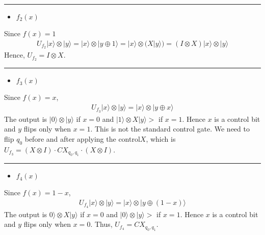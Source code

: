 \documentclass[letterpaper,10pt,english]{jupyterBook}
\begin{document}
\bigskip\hrule\bigskip

\begin{itemize}
\item {}
\sphinxAtStartPar
\(f_2(x)\)

\end{itemize}

\sphinxAtStartPar
Since \(f(x) =1\)
\begin{equation*}
\begin{split}
U_{f_2} |x\rangle \otimes |y\rangle =  |x\rangle \otimes |y \oplus 1\rangle = |x\rangle \otimes (X|y\rangle)
= (I \otimes X)  |x\rangle \otimes |y\rangle
\end{split}
\end{equation*}
\sphinxAtStartPar
Hence, \(U_{f_2} = I \otimes X\).


\bigskip\hrule\bigskip

\begin{itemize}
\item {}
\sphinxAtStartPar
\(f_3(x)\)

\end{itemize}

\sphinxAtStartPar
Since \(f(x) = x\),
\begin{equation*}
\begin{split}
U_{f_3} |x\rangle \otimes |y\rangle =  |x\rangle \otimes |y \oplus x\rangle
\end{split}
\end{equation*}
\sphinxAtStartPar
The output is \(|0\rangle \otimes |y\rangle\) if \(x=0\) and  \(|1\rangle \otimes X|y\rangle>\) if \(x=1\).  Hence \(x\) is a control bit and \(y\) flips only when \(x=1\).  This is not the standard control gate.  We need to flip \(q_0\) before  and after applying the control\sphinxhyphen{}\(X\), which is  \(U_{f_3} = (X \otimes I) \cdot CX_{q_0,q_1} \cdot (X \otimes I)\).


\bigskip\hrule\bigskip

\begin{itemize}
\item {}
\sphinxAtStartPar
\(f_4(x)\)

\end{itemize}

\sphinxAtStartPar
Since \(f(x) = 1-x\),
\begin{equation*}
\begin{split}
U_{f_4} |x\rangle \otimes |y\rangle =  |x\rangle \otimes |y \oplus (1-x) \rangle
\end{split}
\end{equation*}
\sphinxAtStartPar
The output is \(0\rangle \otimes X|y\rangle\) if \(x=0\) and  \(|0\rangle \otimes |y\rangle>\) if \(x=1\).  Hence \(x\) is a control bit and \(y\) flips only when \(x=0\).  Thus,  \(U_{f_4} = CX_{q_0,q_1}\).
\end{document}
